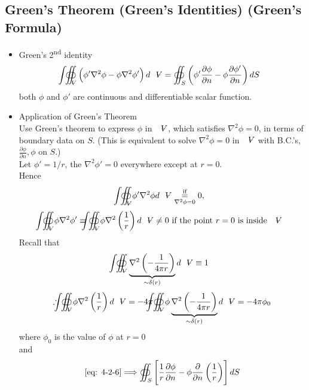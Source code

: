 \subsection{Green's Theorem (Green's Identities) (Green's Formula)}
\begin{itemize}
\item Green's 2\textsuperscript{nd} identity
\begin{equation}
{\oiint \hspace{-23.5pt} \int}_{\volume}\left(\phi'\nabla^2\phi-\phi\nabla^2\phi'\right)d\volume = \oiint_S\left(\phi'\frac{\partial\phi}{\partial n} - \phi\frac{\partial\phi'}{\partial n}\right)dS
\label{eq: 4-2-6}
\end{equation}
both $\phi$ and $\phi'$ are continuous and differentiable scalar function.
\item Application of Green's Theorem\\
Use Green's theorem to express $\phi$ in $\volume$, which satisfies $\nabla^2\phi = 0$, in terms of boundary data on $S$. (This is equivalent to solve $\nabla^2\phi = 0$ in $\volume$ with B.C.'s, $\displaystyle\frac{\partial \phi}{\partial n},\phi$ on $S$.)\\
Let $\phi' = 1/r$, the $\nabla^2\phi' = 0$ everywhere except at $r=0$.\\
Hence
\[
{\oiint \hspace{-23.5pt} \int}_{\volume}\phi'\nabla^2\phi d\volume \vc{=}{\text{if}}{\nabla^2\phi =0} 0, 
\]
\[
{\oiint \hspace{-23.5pt} \int}_{\volume}\phi\nabla^2\phi'\equiv{\oiint \hspace{-23.5pt} \int}_{\volume}\phi\nabla^2\left(\frac{1}{r}\right)d\volume \neq 0\text{ if the point $r=0$ is inside $\volume$}
\]
Recall that
\[
{\oiint \hspace{-23.5pt} \int}_{\volume}\underbrace{\nabla^2\left(-\frac{1}{4\pi r}\right)}_{\sim\delta (r)}d\volume\equiv 1
\]
\[
\therefore{\oiint \hspace{-23.5pt} \int}_{\volume}\phi\nabla^2\left(\frac{1}{r}\right)d\volume = -4\pi{\oiint \hspace{-23.5pt} \int}_{\volume}\phi\underbrace{\nabla^2\left(-\frac{1}{4\pi r}\right)}_{\sim\delta(r)}d\volume = -4\pi\phi_0
\]
where $\phi_0$ is the value of $\phi$ at $r = 0$\\
and
\begin{equation}
\eqref{eq: 4-2-6}\Longrightarrow\oiint_S\left[\frac{1}{r}\frac{\partial\phi}{\partial n} - \phi\frac{\partial}{\partial n}\left(\frac{1}{r}\right)\right]dS

\end{equation}
\end{itemize}
